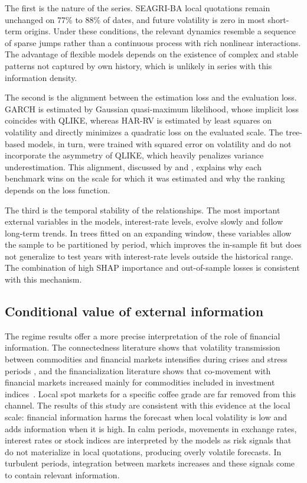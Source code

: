 \documentclass[a4paper,fleqn]{cas-sc}
\begin{document}
The first is the nature of the series. SEAGRI-BA local quotations remain unchanged on 77\% to 88\% of dates, and future volatility is zero in most short-term origins. Under these conditions, the relevant dynamics resemble a sequence of sparse jumps rather than a continuous process with rich nonlinear interactions. The advantage of flexible models depends on the existence of complex and stable patterns not captured by own history, which is unlikely in series with this information density.

The second is the alignment between the estimation loss and the evaluation loss. GARCH is estimated by Gaussian quasi-maximum likelihood, whose implicit loss coincides with QLIKE, whereas HAR-RV is estimated by least squares on volatility and directly minimizes a quadratic loss on the evaluated scale. The tree-based models, in turn, were trained with squared error on volatility and do not incorporate the asymmetry of QLIKE, which heavily penalizes variance underestimation. This alignment, discussed by \citet{Patton2011VolatilityProxy} and \citet{HansenLunde2006ConsistentRanking}, explains why each benchmark wins on the scale for which it was estimated and why the ranking depends on the loss function.

The third is the temporal stability of the relationships. The most important external variables in the models, interest-rate levels, evolve slowly and follow long-term trends. In trees fitted on an expanding window, these variables allow the sample to be partitioned by period, which improves the in-sample fit but does not generalize to test years with interest-rate levels outside the historical range. The combination of high SHAP importance and out-of-sample losses is consistent with this mechanism.

\subsection{Conditional value of external information}
\label{subsec:disc_conditional}

The regime results offer a more precise interpretation of the role of financial information. The connectedness literature shows that volatility transmission between commodities and financial markets intensifies during crises and stress periods \citep{Singh2026OilSoftCommoditySpillovers,Zhou2026CommodityConnectedness}, and the financialization literature shows that co-movement with financial markets increased mainly for commodities included in investment indices~\citep{TangXiong2012,ChengXiong2014}. Local spot markets for a specific coffee grade are far removed from this channel. The results of this study are consistent with this evidence at the local scale: financial information harms the forecast when local volatility is low and adds information when it is high. In calm periods, movements in exchange rates, interest rates or stock indices are interpreted by the models as risk signals that do not materialize in local quotations, producing overly volatile forecasts. In turbulent periods, integration between markets increases and these signals come to contain relevant information.
\end{document}
